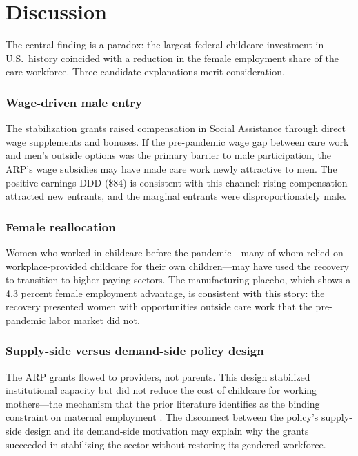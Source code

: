\documentclass[12pt]{article}
\begin{document}
\section{Discussion}

The central finding is a paradox: the largest federal childcare investment in U.S.\ history coincided with a reduction in the female employment share of the care workforce. Three candidate explanations merit consideration.

\subsubsection*{Wage-driven male entry} The stabilization grants raised compensation in Social Assistance through direct wage supplements and bonuses. If the pre-pandemic wage gap between care work and men's outside options was the primary barrier to male participation, the ARP's wage subsidies may have made care work newly attractive to men. The positive earnings DDD (\$84) is consistent with this channel: rising compensation attracted new entrants, and the marginal entrants were disproportionately male.

\subsubsection*{Female reallocation} Women who worked in childcare before the pandemic---many of whom relied on workplace-provided childcare for their own children---may have used the recovery to transition to higher-paying sectors. The manufacturing placebo, which shows a 4.3 percent female employment advantage, is consistent with this story: the recovery presented women with opportunities outside care work that the pre-pandemic labor market did not.

\subsubsection*{Supply-side versus demand-side policy design} The ARP grants flowed to providers, not parents. This design stabilized institutional capacity but did not reduce the cost of childcare for working mothers---the mechanism that the prior literature identifies as the binding constraint on maternal employment \citep{herbst2017universal, blau2003child}. The disconnect between the policy's supply-side design and its demand-side motivation may explain why the grants succeeded in stabilizing the sector without restoring its gendered workforce.
\end{document}
